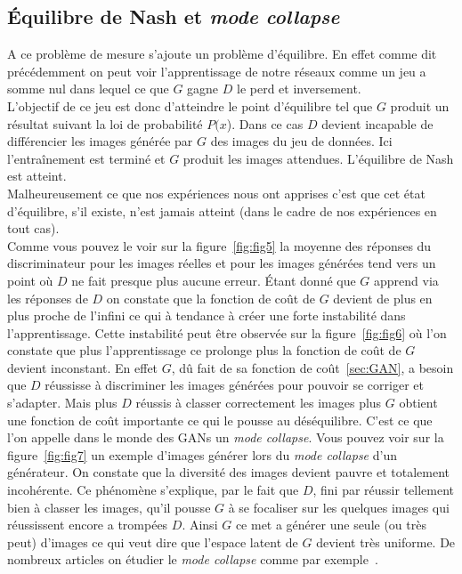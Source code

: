 \documentclass[11pt,francais]{article}
\begin{document}
\subsection{Équilibre de Nash et \textit{mode collapse}}
\label{sec:Nash_Collapse}
A ce problème de mesure s'ajoute un problème d'équilibre. 
En effet comme dit précédemment on peut voir l'apprentissage de notre réseaux comme un jeu a somme nul dans lequel ce que \(G\) gagne \(D\) le perd et inversement.\\
L'objectif de ce jeu est donc d'atteindre le point d'équilibre tel que \(G\) produit un résultat suivant la loi de probabilité \(P(x\)). Dans ce cas \(D\) devient incapable de différencier les images générée par \(G\) des images du jeu de données. Ici l'entraînement est terminé et \(G\) produit les images attendues. L'équilibre de Nash est atteint.\\
Malheureusement ce que nos expériences nous ont apprises c'est que cet état d'équilibre, s'il existe, n'est jamais atteint (dans le cadre de nos expériences en tout cas).\\
Comme vous pouvez le voir sur la figure~\ref{fig:fig5} la moyenne des réponses du discriminateur pour les images réelles et pour les images générées tend vers un point où \(D\) ne fait presque plus aucune erreur. Étant donné que \(G\) apprend via les réponses de \(D\) on constate que la fonction de coût de \(G\) devient de plus en plus proche de l'infini ce qui à tendance à créer une forte instabilité dans l'apprentissage. Cette instabilité peut être observée sur la figure~\ref{fig:fig6} où l'on constate que plus l'apprentissage ce prolonge plus la fonction de coût de \(G\) devient inconstant.
En effet \(G\), dû fait de sa fonction de coût~\ref{sec:GAN}, a besoin que \(D\) réussisse à discriminer les images générées pour pouvoir se corriger et s'adapter. Mais plus \(D\) réussis à classer correctement les images plus \(G\) obtient une fonction de coût importante ce qui le pousse au déséquilibre. C'est ce que l'on appelle dans le monde des GANs un \textit{mode collapse}. Vous pouvez voir sur la figure~\ref{fig:fig7} un exemple d'images générer lors du \textit{mode collapse} d'un générateur. On constate que la diversité des images devient pauvre et totalement incohérente. Ce phénomène s'explique, par le fait que \(D\), fini par réussir tellement bien à classer les images, qu'il pousse \(G\) à se focaliser sur les quelques images qui réussissent encore a trompées \(D\). Ainsi \(G\) ce met a générer une seule (ou très peut) d'images ce qui veut dire que l'espace latent de \(G\) devient très uniforme. De nombreux articles on étudier le \textit{mode collapse} comme par exemple~\cite{NIPS2014_5423}.\\
\end{document}
